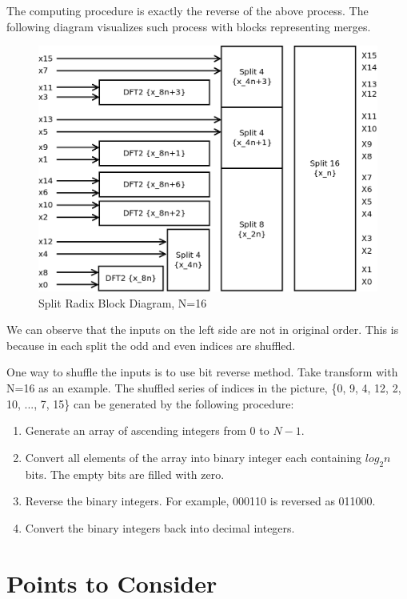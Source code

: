 \documentclass[a4paper]{report}
\begin{document}
	The computing procedure is exactly the reverse of the above process. The following diagram visualizes such process with blocks representing merges.

\begin{figure}[htp]
\centering
\includegraphics[scale=0.3]{../dia/split-radix-16.png}
\caption{Split Radix Block Diagram, N=16}
\end{figure}

	We can observe that the inputs on the left side are not in original order. This is because in each split the odd and even indices are shuffled.
	
	One way to shuffle the inputs is to use bit reverse method. Take transform with N=16 as an example. The shuffled series of indices in the picture, \{0, 9, 4, 12, 2, 10, ..., 7, 15\} can be generated by the following procedure:
	
	\begin{enumerate}
		\item Generate an array of ascending integers from 0 to $N-1$.
		\item Convert all elements of the array into binary integer each containing $log_2n$ bits. The empty bits are filled with zero.
		\item Reverse the binary integers. For example, 000110 is reversed as 011000.
		\item Convert the binary integers back into decimal integers.
	\end{enumerate}

\section{Points to Consider} \indent
\end{document}
